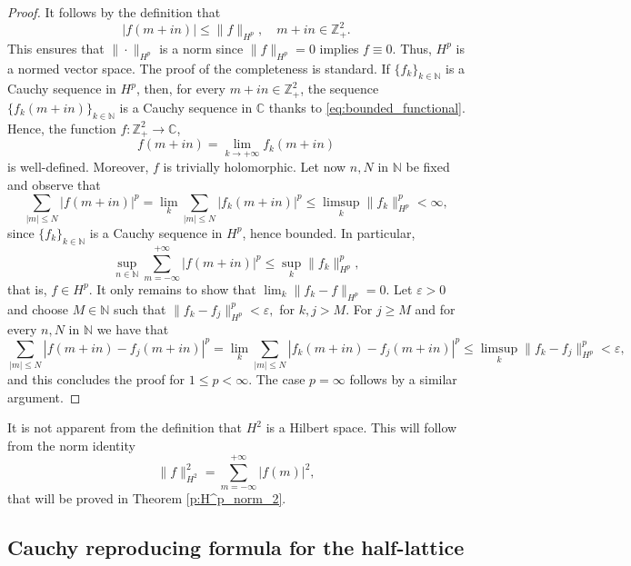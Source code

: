 \documentclass[12pt,a4paper,reqno]{amsart}
\theoremstyle{definition}
\theoremstyle{definition}\newtheorem{defn}[thm]{Definition}
\begin{document}
    \begin{proof}
    It follows by the definition that 
    \begin{equation}\label{eq:bounded_functional}
    |f(m+in)|\leqslant \|f\|_{H^p},\quad m+in\in\mathbb{Z}^2_+.
    \end{equation}
    This ensures that $\|\cdot\|_{H^p}$ is a norm since $\|f\|_{H^p}=0$ implies $f\equiv 0$. Thus, $H^p$ is a normed vector space. The proof of the completeness is standard. If $\{f_k\}_{k\in\mathbb{N}}$ is a Cauchy sequence in $H^p$, then,  for every $m+in\in\mathbb{Z}^2_+$, the sequence  $\big\{ f_k(m+in)\}_{k\in\mathbb{N}}$ is a Cauchy sequence in $\mathbb{C}$ thanks to \eqref{eq:bounded_functional}.   Hence, the function $f\colon \mathbb{Z}^2_+\to\mathbb{C}$,
     \[
     f(m+in)=\lim_{k\to+\infty} f_k(m+in)
     \]
     is well-defined. Moreover, $f$ is trivially holomorphic. Let now $n,N$ in $\mathbb N$ be fixed and observe that 
     \[
     \sum_{|m|\leqslant N} |f(m+in)|^p = \lim_k \sum_{|m|\leqslant N} |f_k(m+in)|^p \leqslant \limsup_k \|f_k\|_{H^p}^p<\infty,
     \] 
     since $\{f_k\}_{k\in\mathbb N}$ is a Cauchy sequence in $H^p$, hence bounded.
     In particular, 
     \[
     \sup_{n\in\mathbb N}\sum_{m=-\infty}^{+\infty} |f(m+in)|^p \leqslant \sup_k \|f_k\|_{H^p}^p,
     \]
    that is, $f\in H^p$. It only remains to show that  $\lim_k\|f_k-f\|_{H^p}=0.$ Let $\varepsilon>0$ and choose $M\in\mathbb{N}$ such that $\|f_k-f_j\|_{H^p}^p<\varepsilon,$ for $k,j>M$. For $j\geqslant M$ and  for every $n,N$ in $\mathbb{N}$ we have that
     \[
     \sum_{|m|\leqslant N} |f(m+in)-f_j(m+in)|^p = \lim_k \sum_{|m|\leqslant N} |f_k(m+in)-f_j(m+in)|^p \leqslant \limsup_k \|f_k-f_j\|_{H^p}^p<\varepsilon,
     \]
    and this concludes the proof for $1\leqslant p<\infty$. The case $p=\infty$ follows by a similar argument.
     \end{proof}
    
    It is not apparent from the definition that $H^2$ is a Hilbert space. This will follow from the norm identity
    \[
    \|f\|^2_{H^2}=\sum_{m=-\infty}^{+\infty}|f(m)|^2,
    \]
    that will be proved in Theorem \ref{p:H^p_norm_2}.
    
    \subsection{Cauchy reproducing formula for the half-lattice}\label{s:cauchy}
    
\end{document}
